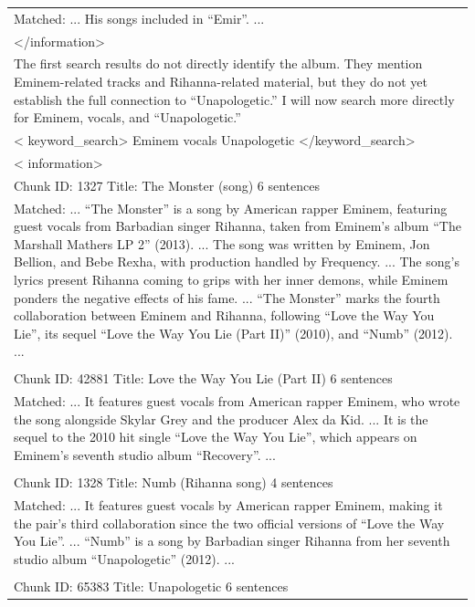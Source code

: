 \documentclass[11pt]{article}
\begin{document}
\begin{longtable}{|p{}|}
Matched: ... His songs included in ``Emir''. ... \\
\textless{}/information\textgreater{} \\
\hline
The first search results do not directly identify the album. They mention Eminem-related tracks and Rihanna-related material, but they do not yet establish the full connection to ``Unapologetic.'' I will now search more directly for Eminem, vocals, and ``Unapologetic.'' \\
\hline
\textless{} keyword\_search\textgreater{} Eminem vocals Unapologetic \textless{}/keyword\_search\textgreater{} \\
\hline
\textless{} information\textgreater{} \\
Chunk ID: 1327 \textbar{} Title: The Monster (song) \textbar{} 6 sentences \\
Matched: ... ``The Monster'' is a song by American rapper Eminem, featuring guest vocals from Barbadian singer Rihanna, taken from Eminem's album ``The Marshall Mathers LP 2'' (2013). ... The song was written by Eminem, Jon Bellion, and Bebe Rexha, with production handled by Frequency. ... The song's lyrics present Rihanna coming to grips with her inner demons, while Eminem ponders the negative effects of his fame. ... ``The Monster'' marks the fourth collaboration between Eminem and Rihanna, following ``Love the Way You Lie'', its sequel ``Love the Way You Lie (Part II)'' (2010), and ``Numb'' (2012). ... \\
\\
Chunk ID: 42881 \textbar{} Title: Love the Way You Lie (Part II) \textbar{} 6 sentences \\
Matched: ... It features guest vocals from American rapper Eminem, who wrote the song alongside Skylar Grey and the producer Alex da Kid. ... It is the sequel to the 2010 hit single ``Love the Way You Lie'', which appears on Eminem's seventh studio album ``Recovery''. ... \\
\\
Chunk ID: 1328 \textbar{} Title: Numb (Rihanna song) \textbar{} 4 sentences \\
Matched: ... It features guest vocals by American rapper Eminem, making it the pair's third collaboration since the two official versions of ``Love the Way You Lie''. ... ``Numb'' is a song by Barbadian singer Rihanna from her seventh studio album ``Unapologetic'' (2012). ... \\
\\
Chunk ID: 65383 \textbar{} Title: Unapologetic \textbar{} 6 sentences \\

\end{longtable}
\end{document}
